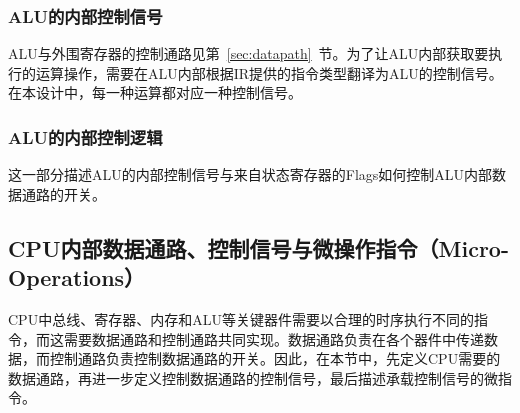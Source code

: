 \documentclass[lang=cn,a4paper,newtx]{elegantpaper}
\begin{document}
\subsubsection{ALU的内部控制信号}
ALU与外围寄存器的控制通路见第~\ref{sec:datapath}~节。为了让ALU内部获取要执行的运算操作，需要在ALU内部根据IR提供的指令类型翻译为ALU的控制信号。在本设计中，每一种运算都对应一种控制信号。


\subsubsection{ALU的内部控制逻辑}
这一部分描述ALU的内部控制信号与来自状态寄存器的Flags如何控制ALU内部数据通路的开关。


\subsection{CPU内部数据通路、控制信号与微操作指令（Micro-Operations）}
CPU中总线、寄存器、内存和ALU等关键器件需要以合理的时序执行不同的指令，而这需要数据通路和控制通路共同实现。数据通路负责在各个器件中传递数据，而控制通路负责控制数据通路的开关。因此，在本节中，先定义CPU需要的数据通路，再进一步定义控制数据通路的控制信号，最后描述承载控制信号的微指令。
\end{document}
